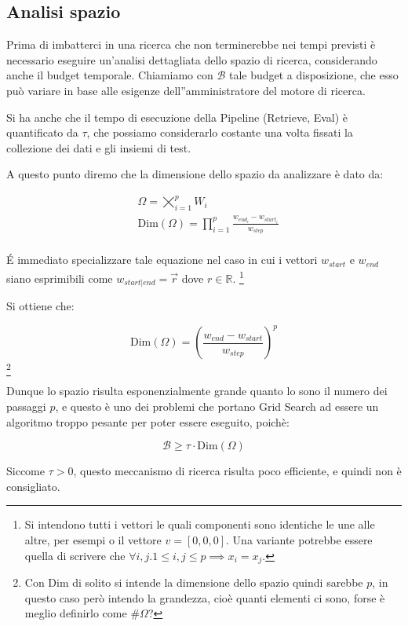 \subsection{Analisi spazio}

Prima di imbatterci in una ricerca che non terminerebbe nei tempi previsti è necessario
eseguire un'analisi dettagliata dello spazio di ricerca, considerando anche il budget temporale.
Chiamiamo con $\mathcal{B}$ tale budget a disposizione, che esso
può variare in base alle esigenze dell''amministratore
del motore di ricerca.

Si ha anche che il tempo di esecuzione della Pipeline (Retrieve, Eval) è quantificato
da $\tau$, che possiamo considerarlo costante una volta fissati la collezione dei dati e gli insiemi di test.

A questo punto diremo che la dimensione dello spazio da analizzare
è dato da:

\begin{align*}\label{eq:gsdim}
& \Omega = \bigtimes_{i=1}^{p} W_i \\
& \text{Dim}(\Omega) = \prod\limits_{i=1}^{p} \frac{w_{end_i} - w_{start_i}}{w_{step}} \\
\end{align*}

\'E immediato specializzare tale equazione nel caso in cui i vettori $w_{start}$ e $w_{end}$
siano esprimibili come $w_{start|end} = \vec{r}$ dove $r \in \mathbb{R}$. \footnote{
	Si intendono tutti i vettori le quali componenti sono identiche le une alle altre, per esempi o il vettore $v = \left[0, 0, 0\right]$.
	Una variante potrebbe essere quella di scrivere che $\forall{i,j.1 \leq i,j \leq p} \implies x_i = x_j$.
}


Si ottiene che:

$$
\text{Dim}(\Omega) = \left(\frac{w_{end} - w_{start}}{w_{step}}\right)^{p}
$$\footnote{Con Dim di solito si intende la dimensione dello spazio quindi sarebbe $p$, in questo caso però intendo la grandezza, cioè quanti elementi ci sono, forse è meglio definirlo come $\#\Omega$?}

Dunque lo spazio risulta esponenzialmente grande quanto lo sono il numero
dei passaggi $p$, e questo è uno dei problemi che portano Grid Search ad essere
un algoritmo troppo pesante per poter essere eseguito, poichè:

$$
\mathcal{B} \geq \tau \cdot \text{Dim}(\Omega)
$$

Siccome $\tau > 0$, questo meccanismo di ricerca risulta poco efficiente, e quindi non è consigliato.

